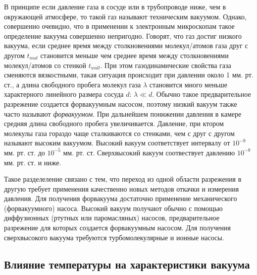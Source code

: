 \documentclass[12pt]{article}
\begin{document}
В принципе если давление газа в сосуде или в трубопроводе ниже, чем в окружающей атмосфере, то такой газ называют техническим вакуумом. Однако, совершенно очевидно, что в применении к электронным микроскопам такое определение вакуума совершенно непригодно. Говорят, что газ достиг низкого вакуума, если среднее время между столкновениями молекул/атомов газа друг с другом $t_{mol}$ становится меньше чем среднее время между столкновениями молекул/атомов со стенкой $t_{wall}$. При этом газодинамические свойства газа сменяются вязкостными, такая ситуация происходит при давлении около 1 мм. рт. ст., а длина свободного пробега молекул газа $\lambda$ становится много меньше характерного линейного размера сосуда $d$: $\lambda \ll d$. Обычно такое предварительное разрежение создается форвакуумным насосом, поэтому низкий вакуум также часто называют \textit{форвакуумом}. При дальнейшем понижении давления в камере средняя длина свободного пробега увеличивается. Давление, при ктором молекулы газа гораздо чаще сталкиваются со стенками, чем с друг с другом называют высоким вакуумом. Высокий вакуум соответствует интервалу от $10^{-9}$ мм. рт. ст. до $10^{-5}$ мм. рт. ст. Сверхвысокий вакуум соотвествует давлению $10^{-9}$ мм. рт. ст. и ниже. \par
Такое разделеление связано с тем, что переход из одной области разрежения в другую требует применения качественно новых методов откачки и измерения давления. Для получения форвакуума достаточно применение механического (форвакуумного) насоса. Высокий вакуум получают обычно с помощью диффузионных (ртутных или паромасляных) насосов, предварительное разрежение для которых создается форвакуумным насосом. Для получения сверхвысокого вакуума требуются турбомолекулярные и ионные насосы.

\subsection*{Влияние температуры на характеристики вакуума}
\end{document}
